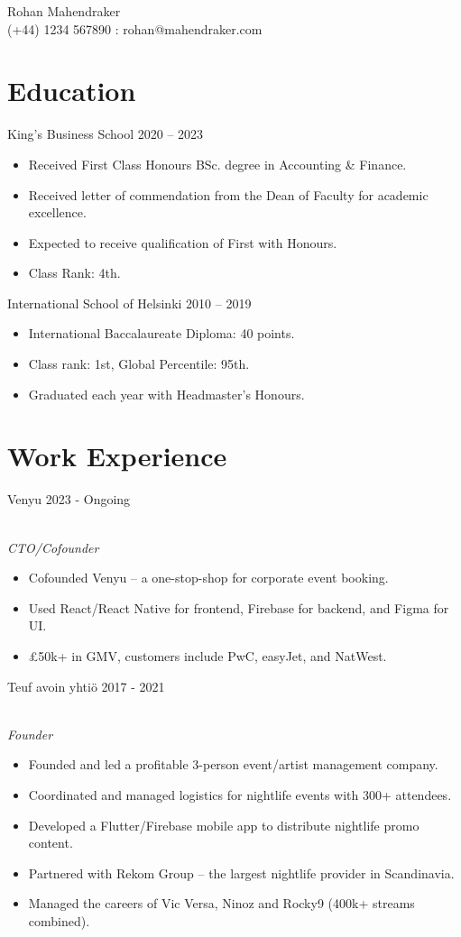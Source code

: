 \documentclass[a4paper,11pt]{article}
\newcommand{\hdr}[2]{{\raggedright\Large #1 \hfill #2}}
\newcommand{\itm}{\item[-]}
\begin{document}
\begin{center}
\begin{scshape}
{\huge\sffamily Rohan Mahendraker}\\
\medskip
\textsf{(+44) 1234 567890  :  rohan@mahendraker.com}
\end{scshape}
\end{center}

\section{Education}
\hdr{King's Business School}{2020 -- 2023}
\begin{itemize}
	\itm Received First Class Honours BSc. degree in Accounting \& Finance.
	\itm Received letter of commendation from the Dean of Faculty for academic excellence.
	\itm Expected to receive qualification of First with Honours.
	\itm Class Rank: 4th.
\end{itemize}
\medskip
\hdr{International School of Helsinki}{2010 -- 2019}
\begin{itemize}
    	\itm International Baccalaureate Diploma: 40 points.
	\itm Class rank: 1st, Global Percentile: 95th.
	\itm Graduated each year with Headmaster's Honours.
\end{itemize}


\section{Work Experience}
\hdr{Venyu}{2023 - Ongoing}\\[2mm]
\emph{\large CTO/Cofounder}
\begin{itemize}
	\itm Cofounded Venyu – a one-stop-shop for corporate event booking.
	\itm Used React/React Native for frontend, Firebase for backend, and Figma for UI.
    	\itm £50k+ in GMV, customers include PwC, easyJet, and NatWest.
\end{itemize}
\bigskip

\hdr{Teuf avoin yhti\"{o}}{2017 - 2021}\\[2mm]
\emph{\large Founder}
\begin{itemize}
	\itm Founded and led a profitable 3-person event/artist management company.
    	\itm Coordinated and managed logistics for nightlife events with 300+ attendees.
	\itm Developed a Flutter/Firebase mobile app to distribute nightlife promo content.
	\itm Partnered with Rekom Group – the largest nightlife provider in Scandinavia.
	\itm Managed the careers of Vic Versa, Ninoz and Rocky9 (400k+ streams combined). 

\end{itemize}
\end{document}
